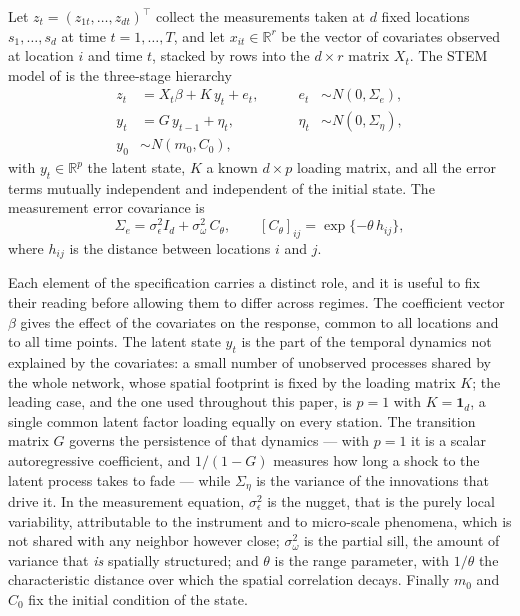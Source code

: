 Let $z_t = (z_{1t},\ldots,z_{dt})^\top$ collect the measurements taken at $d$ fixed locations $s_1,\ldots,s_d$ at time $t = 1,\ldots,T$, and let $x_{it} \in \mathbb{R}^{r}$ be the vector of covariates observed at location $i$ and time $t$, stacked by rows into the $d \times r$ matrix $X_t$. The STEM model of \citet{FassoCameletti2007,FassoCameletti2010} is the three-stage hierarchy
\begin{align}
  z_t &= X_t \beta + K\, y_t + e_t, \qquad & e_t &\sim N(0, \Sigma_e), \label{eq:meas}\\
  y_t &= G\, y_{t-1} + \eta_t, \qquad & \eta_t &\sim N(0, \Sigma_\eta), \label{eq:state}\\
  y_0 &\sim N(m_0, C_0), \label{eq:init}
\end{align}
with $y_t \in \mathbb{R}^{p}$ the latent state, $K$ a known $d \times p$ loading matrix, and all the error terms mutually independent and independent of the initial state. The measurement error covariance is
\begin{equation}\label{eq:Sigmae}
  \Sigma_e = \sigma^2_\epsilon I_d + \sigma^2_\omega\, C_\theta,
  \qquad [C_\theta]_{ij} = \exp\{-\theta\, h_{ij}\},
\end{equation}
where $h_{ij}$ is the distance between locations $i$ and $j$.

Each element of the specification carries a distinct role, and it is useful to fix their reading before allowing them to differ across regimes. The coefficient vector $\beta$ gives the effect of the covariates on the response, common to all locations and to all time points. The latent state $y_t$ is the part of the temporal dynamics not explained by the covariates: a small number of unobserved processes shared by the whole network, whose spatial footprint is fixed by the loading matrix $K$; the leading case, and the one used throughout this paper, is $p = 1$ with $K = \mathbf{1}_d$, a single common latent factor loading equally on every station. The transition matrix $G$ governs the persistence of that dynamics --- with $p = 1$ it is a scalar autoregressive coefficient, and $1/(1-G)$ measures how long a shock to the latent process takes to fade --- while $\Sigma_\eta$ is the variance of the innovations that drive it. In the measurement equation, $\sigma^2_\epsilon$ is the nugget, that is the purely local variability, attributable to the instrument and to micro-scale phenomena, which is not shared with any neighbor however close; $\sigma^2_\omega$ is the partial sill, the amount of variance that \emph{is} spatially structured; and $\theta$ is the range parameter, with $1/\theta$ the characteristic distance over which the spatial correlation decays. Finally $m_0$ and $C_0$ fix the initial condition of the state.

